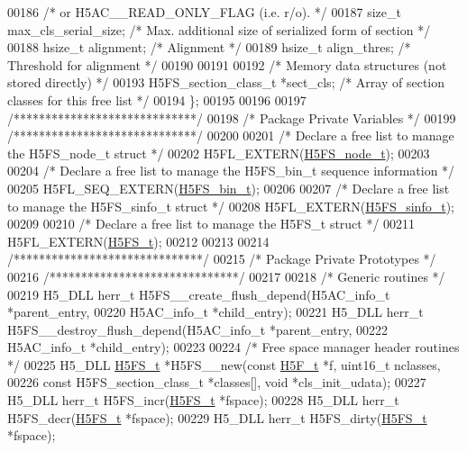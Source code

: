 \begin{DoxyCode}
00186                 \textcolor{comment}{/* or H5AC\_\_READ\_ONLY\_FLAG (i.e. r/o).         */}
00187     \textcolor{keywordtype}{size\_t} max\_cls\_serial\_size; \textcolor{comment}{/* Max. additional size of serialized form of section */}
00188     hsize\_t    alignment;       \textcolor{comment}{/* Alignment                            */}
00189     hsize\_t    align\_thres;     \textcolor{comment}{/* Threshold for alignment              */}
00190 
00191 
00192 \textcolor{comment}{/* Memory data structures (not stored directly) */}
00193     H5FS\_section\_class\_t *sect\_cls; \textcolor{comment}{/* Array of section classes for this free list */}
00194 \};
00195 
00196 
00197 \textcolor{comment}{/*****************************/}
00198 \textcolor{comment}{/* Package Private Variables */}
00199 \textcolor{comment}{/*****************************/}
00200 
00201 \textcolor{comment}{/* Declare a free list to manage the H5FS\_node\_t struct */}
00202 H5FL\_EXTERN(\hyperlink{struct_h5_f_s__node__t}{H5FS\_node\_t});
00203 
00204 \textcolor{comment}{/* Declare a free list to manage the H5FS\_bin\_t sequence information */}
00205 H5FL\_SEQ\_EXTERN(\hyperlink{struct_h5_f_s__bin__t}{H5FS\_bin\_t});
00206 
00207 \textcolor{comment}{/* Declare a free list to manage the H5FS\_sinfo\_t struct */}
00208 H5FL\_EXTERN(\hyperlink{struct_h5_f_s__sinfo__t}{H5FS\_sinfo\_t});
00209 
00210 \textcolor{comment}{/* Declare a free list to manage the H5FS\_t struct */}
00211 H5FL\_EXTERN(\hyperlink{struct_h5_f_s__t}{H5FS\_t});
00212 
00213 
00214 \textcolor{comment}{/******************************/}
00215 \textcolor{comment}{/* Package Private Prototypes */}
00216 \textcolor{comment}{/******************************/}
00217 
00218 \textcolor{comment}{/* Generic routines */}
00219 H5\_DLL herr\_t H5FS\_\_create\_flush\_depend(H5AC\_info\_t *parent\_entry,
00220     H5AC\_info\_t *child\_entry);
00221 H5\_DLL herr\_t H5FS\_\_destroy\_flush\_depend(H5AC\_info\_t *parent\_entry,
00222     H5AC\_info\_t *child\_entry);
00223 
00224 \textcolor{comment}{/* Free space manager header routines */}
00225 H5\_DLL \hyperlink{struct_h5_f_s__t}{H5FS\_t} *H5FS\_\_new(\textcolor{keyword}{const} \hyperlink{struct_h5_f__t}{H5F\_t} *f, uint16\_t nclasses,
00226     \textcolor{keyword}{const} H5FS\_section\_class\_t *classes[], \textcolor{keywordtype}{void} *cls\_init\_udata);
00227 H5\_DLL herr\_t H5FS\_incr(\hyperlink{struct_h5_f_s__t}{H5FS\_t} *fspace);
00228 H5\_DLL herr\_t H5FS\_decr(\hyperlink{struct_h5_f_s__t}{H5FS\_t} *fspace);
00229 H5\_DLL herr\_t H5FS\_dirty(\hyperlink{struct_h5_f_s__t}{H5FS\_t} *fspace);

\end{DoxyCode}
